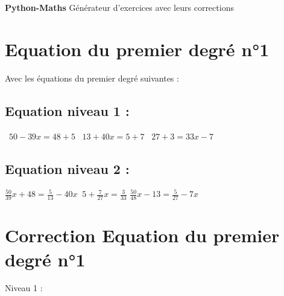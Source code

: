 \documentclass{article}%
\begin{document}
%
\normalsize%
\pagestyle{header}%
\begin{minipage}{\textwidth}%
\centering%
\vspace*{200pt}%
\fontsize{50}{36}%
\selectfont%
\textbf{Python{-}Maths}%
\linebreak%
\fontsize{30}{24}%
\selectfont%
Générateur d'exercices avec leurs corrections%
\end{minipage}%
\newpage%
\fontsize{12}{10}%
\selectfont%
\section*{Equation du premier degré n°1}%
\label{sec:Equationdupremierdegrn1}%
Avec les équations du premier degré suivantes : %
\subsection*{Equation niveau 1 : }%
\label{subsec:Equationniveau1}%
\ $50 - 39x = 48 + 5 $%
\vspace{5mm}%
\newline%
\ $13 + 40x  = 5 + 7$%
\vspace{5mm}%
\newline%
\ $27 + 3 = 33x - 7$

%
\subsection*{Equation niveau 2 : }%
\label{subsec:Equationniveau2}%
$\frac{50}{39}x + 48 = \frac{5}{13} - 40x$%
\vspace{5mm}%
\newline%
$\ 5 + \frac{7}{27}x = \frac{3}{33}$%
\vspace{5mm}%
\newline%
$\frac{50}{48}x - 13 = \frac{5}{27} - 7x$%
\vspace{5mm}%
\newline

%
\newpage%
\section*{Correction Equation du premier degré n°1}%
\label{sec:CorrectionEquationdupremierdegrn1}%
Niveau 1 :%
\end{document}

